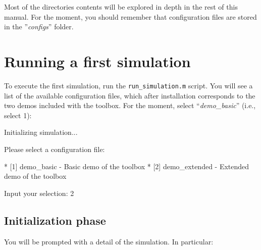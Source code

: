 \noindent Most of the directories contents will be explored in depth in the rest of this manual. For the moment, you should remember that configuration files are stored in the ''\textit{configs}'' folder.

\section{Running a first simulation}

To execute the first simulation, run the \verb|run_simulation.m| script. You will see a list of the available configuration files, which after installation corresponds to the two demos included with the toolbox. For the moment, select ``\textit{demo\_basic}'' (i.e., select 1):

\newpage

\begin{console}
Initializing simulation...

Please select a configuration file:
 
	 * [1] demo_basic - Basic demo of the toolbox 
	 * [2] demo_extended - Extended demo of the toolbox 

Input your selection: 2
\end{console}

\subsection{Initialization phase}

You will be prompted with a detail of the simulation. In particular:


